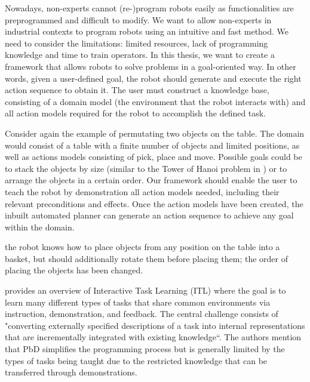 Nowadays, non-experts cannot (re-)program robots easily as functionalities are preprogrammed and difficult to modify.
We want to allow non-experts in industrial contexts to program robots using an intuitive and fast method.
We need to consider the limitations: limited resources, lack of programming knowledge and time to train operators.
In this thesis, we want to create a framework that allows robots to solve problems in a goal-oriented way.
In other words, given a user-defined goal, the robot should generate and execute the right action sequence to obtain it.
The user must construct a knowledge base, consisting of a domain model (the environment that the robot interacts with) and all action models required for the robot to accomplish the defined task.

Consider again the example of permutating two objects on the table.
The domain would consist of a table with a finite number of objects and limited positions, as well as actions models consisting of pick, place and move. Possible goals could be to stack the objects by size (similar to the Tower of Hanoi problem in \cite{douglas1985metamagical}) or to arrange the objects in a certain order. Our framework should enable the user to teach the robot by demonstration all action models needed, including their relevant preconditions and effects. Once the action models have been created, the inbuilt automated planner can generate an action sequence to achieve any goal within the domain. 

the robot knows how to place objects from any position on the table into a basket, but should additionally rotate them before placing them;
the order of placing the objects has been changed.

\cite{laird2017interactive} provides an overview of Interactive Task Learning (ITL) where the goal is to learn many different types of tasks that share common environments via instruction, demonstration, and feedback. 
The central challenge consists of "converting externally specified descriptions of a task into internal representations that are incrementally integrated with existing knowledge``.
The authors mention that PbD simplifies the programming process but is generally limited by the types of tasks being taught due to the restricted knowledge that can be transferred through demonstrations.

